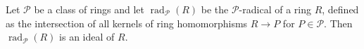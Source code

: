 Let $\mathcal{P}$ be a class of rings and let $\operatorname{rad}_{\mathcal{P}}(R)$ be the $\mathcal{P}$-radical of a ring $R$, defined as the intersection of all kernels of ring homomorphisms $R \to P$ for $P \in \mathcal{P}$. Then $\operatorname{rad}_{\mathcal{P}}(R)$ is an ideal of $R$.
